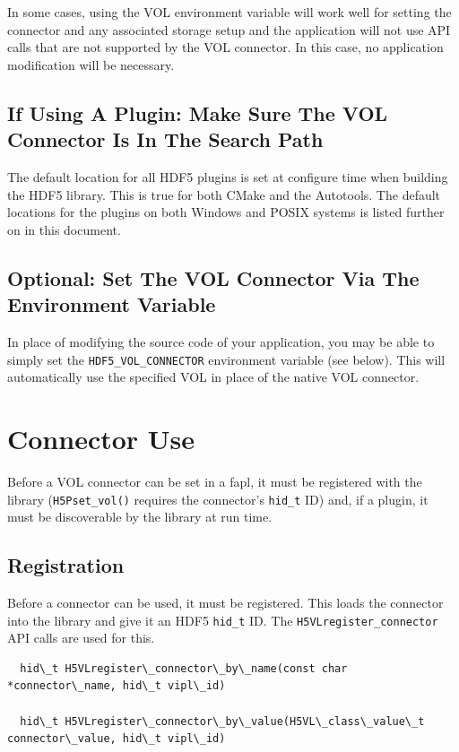 In some cases, using the VOL environment variable will work well for setting the connector and any associated storage setup and the application will not use API calls that are not supported by the VOL connector. In this case, no application modification will be necessary.

\subsection{If Using A Plugin: Make Sure The VOL Connector Is In The Search Path}

The default location for all HDF5 plugins is set at configure time when building the HDF5 library. This is true for both CMake and the Autotools. The default locations for the plugins on both Windows and POSIX systems is listed further on in this document.

\subsection{Optional: Set The VOL Connector Via The Environment Variable}

In place of modifying the source code of your application, you may be able to simply set the {\tt HDF5\_VOL\_CONNECTOR} environment variable (see below). This will automatically use the specified VOL in place of the native VOL connector.

\section{Connector Use}

Before a VOL connector can be set in a fapl, it must be registered with the library ({\tt H5Pset\_vol()} requires the connector's {\tt hid\_t} ID) and, if a plugin, it must be discoverable by the library at run time.

\subsection{Registration}

Before a connector can be used, it must be registered. This loads the connector into the library and give it an HDF5 {\tt hid\_t} ID. The {\tt H5VLregister\_connector} API calls are used for this.

\begin{lstlisting}
  hid\_t H5VLregister\_connector\_by\_name(const char *connector\_name, hid\_t vipl\_id)

  hid\_t H5VLregister\_connector\_by\_value(H5VL\_class\_value\_t connector\_value, hid\_t vipl\_id)
\end{lstlisting}

